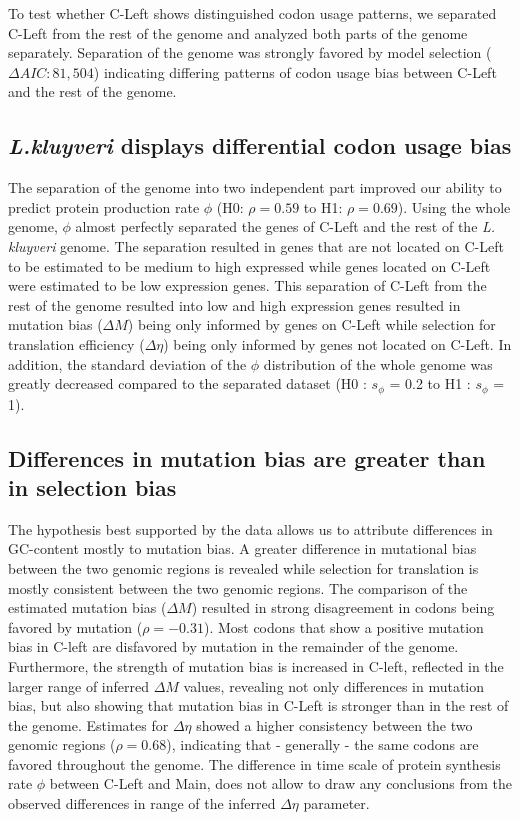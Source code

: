 \documentclass[12pt,draft]{article}
\begin{document}
To test whether C-Left shows distinguished codon usage patterns, we separated C-Left from the rest of the genome and analyzed both parts of the genome separately.
Separation of the genome was strongly favored by model selection ($\Delta AIC: 81,504$) indicating differing patterns of codon usage bias between C-Left and the rest of the genome.

\subsection*{\textit{L.kluyveri} displays differential codon usage bias}
The separation of the genome into two independent part improved our ability to predict protein production rate $\phi$ (H0: $\rho = 0.59$ to H1: $\rho = 0.69$).
Using the whole genome, $\phi$ almost perfectly separated the genes of C-Left and the rest of the \textit{L. kluyveri} genome. 
The separation resulted in genes that are not located on C-Left to be estimated to be medium to high expressed while genes located on C-Left were estimated to be low expression genes. 
This separation of C-Left from the rest of the genome resulted into low and high expression genes resulted in mutation bias ($\Delta M$) being only informed by genes on C-Left while selection for translation efficiency ($\Delta \eta$) being only informed by genes not located on C-Left. 
In addition, the standard deviation of the $\phi$ distribution of the whole genome was greatly decreased compared to the separated dataset (H0 : $s_{\phi}$ = 0.2 to H1 : $s_{\phi}$ = 1).

\subsection*{Differences in mutation bias are greater than in selection bias}
The hypothesis best supported by the data allows us to attribute differences in GC-content mostly to mutation bias. 
A greater difference in mutational bias between the two genomic regions is revealed while selection for translation is mostly consistent between the two genomic regions. 
The comparison of the estimated mutation bias ($\Delta M$) resulted in strong disagreement in codons being favored by mutation ($\rho = -0.31$). 
Most codons that show a positive mutation bias in C-left are disfavored by mutation in the remainder of the genome.  
Furthermore, the strength of mutation bias is increased in C-left, reflected in the larger range of inferred $\Delta M$ values, revealing not only differences in mutation bias, but also showing that mutation bias in C-Left is stronger than in the rest of the genome. 
Estimates for $\Delta \eta$ showed a higher consistency between the two genomic regions ($\rho = 0.68$), indicating that - generally - the same codons are favored throughout the genome. 
The difference in time scale of protein synthesis rate $\phi$ between C-Left and Main, does not allow to draw any conclusions from the observed differences in range of the inferred $\Delta \eta$ parameter.
\end{document}
